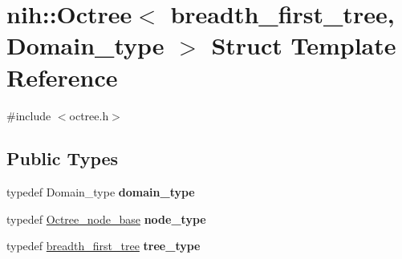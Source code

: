 \hypertarget{structnih_1_1_octree_3_01breadth__first__tree_00_01_domain__type_01_4}{
\section{nih\-:\-:\-Octree$<$ breadth\-\_\-first\-\_\-tree, \-Domain\-\_\-type $>$ \-Struct \-Template \-Reference}
\label{structnih_1_1_octree_3_01breadth__first__tree_00_01_domain__type_01_4}
}


{\ttfamily \#include $<$octree.\-h$>$}

\subsection*{\-Public \-Types}
\begin{DoxyCompactItemize}
\item 
\hypertarget{structnih_1_1_octree_3_01breadth__first__tree_00_01_domain__type_01_4_a157307c8173958f3619aa968042dd04b}{
typedef \-Domain\-\_\-type {\bfseries domain\-\_\-type}}
\label{structnih_1_1_octree_3_01breadth__first__tree_00_01_domain__type_01_4_a157307c8173958f3619aa968042dd04b}

\item 
\hypertarget{structnih_1_1_octree_3_01breadth__first__tree_00_01_domain__type_01_4_a452331fae12f9d402d7076f1e0161ad7}{
typedef \hyperlink{structnih_1_1_octree__node__base}{\-Octree\-\_\-node\-\_\-base} {\bfseries node\-\_\-type}}
\label{structnih_1_1_octree_3_01breadth__first__tree_00_01_domain__type_01_4_a452331fae12f9d402d7076f1e0161ad7}

\item 
\hypertarget{structnih_1_1_octree_3_01breadth__first__tree_00_01_domain__type_01_4_a14a35a080d32928795cae3a110201bb9}{
typedef \hyperlink{structnih_1_1breadth__first__tree}{breadth\-\_\-first\-\_\-tree} {\bfseries tree\-\_\-type}}
\label{structnih_1_1_octree_3_01breadth__first__tree_00_01_domain__type_01_4_a14a35a080d32928795cae3a110201bb9}

\end{DoxyCompactItemize}
